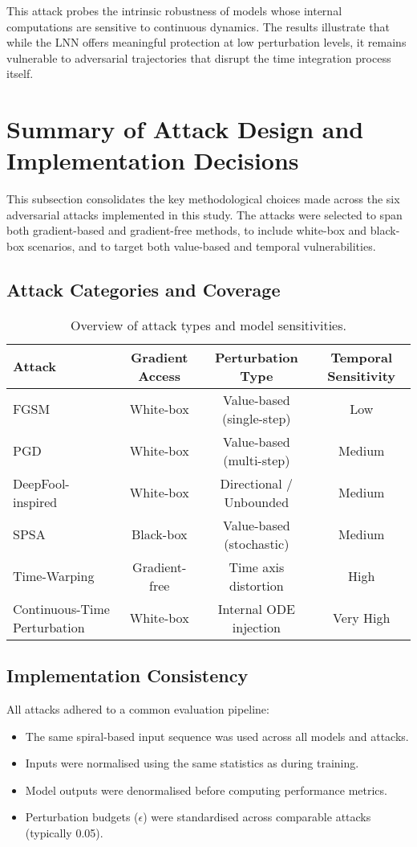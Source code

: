 This attack probes the intrinsic robustness of models whose internal computations are sensitive to continuous dynamics. The results illustrate that while the LNN offers meaningful protection at low perturbation levels, it remains vulnerable to adversarial trajectories that disrupt the time integration process itself.

\section{Summary of Attack Design and Implementation Decisions}

This subsection consolidates the key methodological choices made across the six adversarial attacks implemented in this study. The attacks were selected to span both gradient-based and gradient-free methods, to include white-box and black-box scenarios, and to target both value-based and temporal vulnerabilities.

\subsection{Attack Categories and Coverage}
\begin{table}[H]
\centering
\begin{tabular}{|l|c|c|c|}
\hline
\textbf{Attack} & \textbf{Gradient Access} & \textbf{Perturbation Type} & \textbf{Temporal Sensitivity} \\
\hline
FGSM & White-box & Value-based (single-step) & Low \\
PGD & White-box & Value-based (multi-step) & Medium \\
DeepFool-inspired & White-box & Directional / Unbounded & Medium \\
SPSA & Black-box & Value-based (stochastic) & Medium \\
Time-Warping & Gradient-free & Time axis distortion & High \\
Continuous-Time Perturbation & White-box & Internal ODE injection & Very High \\
\hline
\end{tabular}
\caption{Overview of attack types and model sensitivities.}
\label{tab:attack_summary}
\end{table}

\subsection{Implementation Consistency}
All attacks adhered to a common evaluation pipeline:
\begin{itemize}
    \item The same spiral-based input sequence was used across all models and attacks.
    \item Inputs were normalised using the same statistics as during training.
    \item Model outputs were denormalised before computing performance metrics.
    \item Perturbation budgets ($\epsilon$) were standardised across comparable attacks (typically 0.05).
\end{itemize}

